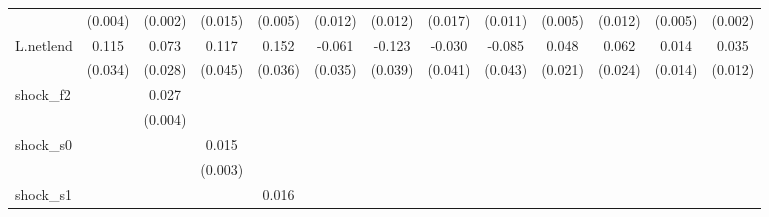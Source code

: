 {\begin{tabular}{l*{12}{c}}
            &     (0.004)         &     (0.002)         &     (0.015)         &     (0.005)         &     (0.012)         &     (0.012)         &     (0.017)         &     (0.011)         &     (0.005)         &     (0.012)         &     (0.005)         &     (0.002)         \\
\addlinespace
L.netlend   &       0.115\sym{***}&       0.073\sym{**} &       0.117\sym{**} &       0.152\sym{***}&      -0.061\sym{*}  &      -0.123\sym{***}&      -0.030         &      -0.085\sym{*}  &       0.048\sym{**} &       0.062\sym{**} &       0.014         &       0.035\sym{***}\\
            &     (0.034)         &     (0.028)         &     (0.045)         &     (0.036)         &     (0.035)         &     (0.039)         &     (0.041)         &     (0.043)         &     (0.021)         &     (0.024)         &     (0.014)         &     (0.012)         \\
\addlinespace
shock\_f2    &                     &       0.027\sym{***}&                     &                     &                     &                     &                     &                     &                     &                     &                     &                     \\
            &                     &     (0.004)         &                     &                     &                     &                     &                     &                     &                     &                     &                     &                     \\
\addlinespace
shock\_s0    &                     &                     &       0.015\sym{***}&                     &                     &                     &                     &                     &                     &                     &                     &                     \\
            &                     &                     &     (0.003)         &                     &                     &                     &                     &                     &                     &                     &                     &                     \\
\addlinespace
shock\_s1    &                     &                     &                     &       0.016\sym{***}&                     &                     &                     &                     &                     &                     &                     &                     \\

\end{tabular}}
